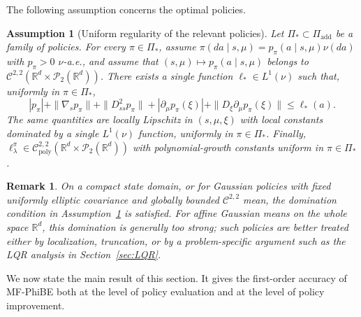 \documentclass[a4paper, 10pt, english, reqno]{amsart}
\newtheorem{assumptions}[theorem]{Assumption}
\newtheorem{remark}[theorem]{Remark}
\begin{document}
The following assumption concerns the optimal policies. 

\begin{assumptions}[Uniform regularity of the relevant policies]
\label{ass:optimal-policy-regularity}
Let $\Pi_*\subset\Pi_{\mathrm{add}}$ be a family of policies. For every
$\pi\in\Pi_*$, assume
$\pi(da\mid s,\mu)=p_\pi(a\mid s,\mu)\nu(da)$ with $p_\pi>0$
$\nu$-a.e., and assume that
$(s,\mu)\mapsto p_\pi(a\mid s,\mu)$ belongs to
$\mathcal C^{2,2}(\mathbb R^d\times\mathcal P_2(\mathbb R^d))$.
There exists a single function $\ell_*\in L^1(\nu)$ such that, uniformly
in $\pi\in\Pi_*$,
\[
|p_\pi|
+\|\nabla_s p_\pi\|
+\|D_{ss}^2p_\pi\|
+|\partial_\mu p_\pi(\xi)|
+\|D_\xi\partial_\mu p_\pi(\xi)\|
\le \ell_*(a).
\]
The same quantities are locally Lipschitz in $(s,\mu,\xi)$ with local
constants dominated by a single $L^1(\nu)$ function, uniformly in
$\pi\in\Pi_*$. Finally,
$\ell_\lambda^\pi\in
\mathcal C^{2,2}_{\mathrm{poly}}
(\mathbb R^d\times\mathcal P_2(\mathbb R^d))$
with polynomial-growth constants uniform in $\pi\in\Pi_*$.
\end{assumptions}

\begin{remark}\label{rem:policy-regularity-approximation}
    On a compact state domain, or for Gaussian policies with fixed uniformly elliptic covariance and globally bounded $\mathcal C^{2,2}$ mean, the domination condition in Assumption~\ref{ass:optimal-policy-regularity} is satisfied. For affine Gaussian means on the whole space $\mathbb{R}^d$, this domination is generally too strong; such policies are better treated either by localization, truncation, or by a problem-specific argument such as the LQR analysis in Section~\ref{sec:LQR}.
\end{remark}



We now state the main result of this section. It gives the first-order
accuracy of MF-PhiBE both at the level of policy evaluation and at the
level of policy improvement.
\end{document}
